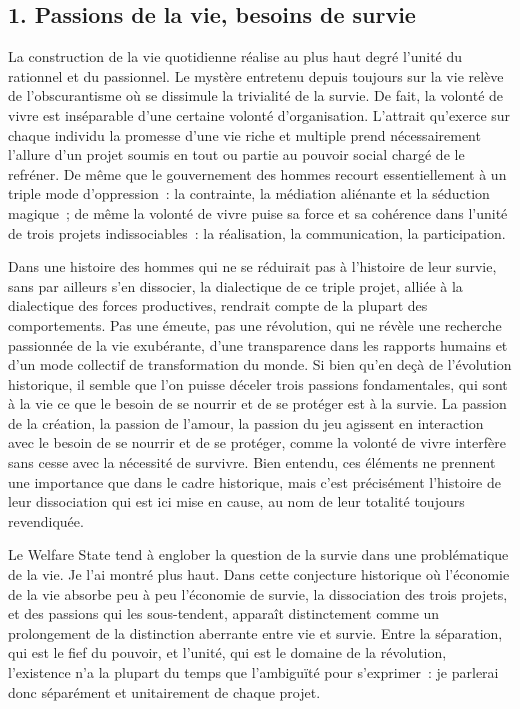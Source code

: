 \documentclass[french,twoside]{book} %
\begin{document}
\subsection[{1. Passions de la vie, besoins de survie}]{\textsc{1.} Passions de la vie, besoins de survie}
\noindent La construction de la vie quotidienne réalise au plus haut degré l’unité du rationnel et du passionnel. Le mystère entretenu depuis toujours sur la vie relève de l’obscurantisme où se dissimule la trivialité de la survie. De fait, la volonté de vivre est inséparable d’une certaine volonté d’organisation. L’attrait qu’exerce sur chaque individu la promesse d’une vie riche et multiple prend nécessairement l’allure d’un projet soumis en tout ou partie au pouvoir social chargé de le refréner. De même que le gouvernement des hommes recourt essentiellement à un triple mode d’oppression : la contrainte, la médiation aliénante et la séduction magique ; de même la volonté de vivre puise sa force et sa cohérence dans l’unité de trois projets indissociables : la réalisation, la communication, la participation.\par
Dans une histoire des hommes qui ne se réduirait pas à l’histoire de leur survie, sans par ailleurs s’en dissocier, la dialectique de ce triple projet, alliée à la dialectique des forces productives, rendrait compte de la plupart des comportements. Pas une émeute, pas une révolution, qui ne révèle une recherche passionnée de la vie exubérante, d’une transparence dans les rapports humains et d’un mode collectif de transformation du monde. Si bien qu’en deçà de l’évolution historique, il semble que l’on puisse déceler trois passions fondamentales, qui sont à la vie ce que le besoin de se nourrir et de se protéger est à la survie. La passion de la création, la passion de l’amour, la passion du jeu agissent en interaction avec le besoin de se nourrir et de se protéger, comme la volonté de vivre interfère sans cesse avec la nécessité de survivre. Bien entendu, ces éléments ne prennent une importance que dans le cadre historique, mais c’est précisément l’histoire de leur dissociation qui est ici mise en cause, au nom de leur totalité toujours revendiquée.\par
Le Welfare State tend à englober la question de la survie dans une problématique de la vie. Je l’ai montré plus haut. Dans cette conjecture historique où l’économie de la vie absorbe peu à peu l’économie de survie, la dissociation des trois projets, et des passions qui les sous-tendent, apparaît distinctement comme un prolongement de la distinction aberrante entre vie et survie. Entre la séparation, qui est le fief du pouvoir, et l’unité, qui est le domaine de la révolution, l’existence n’a la plupart du temps que l’ambiguïté pour s’exprimer : je parlerai donc séparément et unitairement de chaque projet.\par
\end{document}
